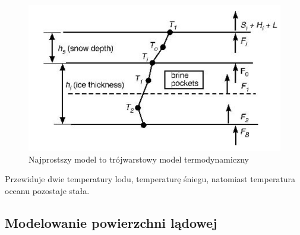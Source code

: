 \documentclass{article}
\theoremstyle{plain}
\begin{document}
	\begin{figure}[h]
		\begin{center}
			\includegraphics[width=0.8\linewidth]{images/Figure7.png}
			\caption{Najprostszy model to trójwarstowy model termodynamiczny}
		\end{center}
	\end{figure}
Przewiduje dwie temperatury lodu, temperaturę śniegu, natomiast temperatura oceanu pozostaje stała.


\subsection{Modelowanie powierzchni lądowej}
\end{document}
